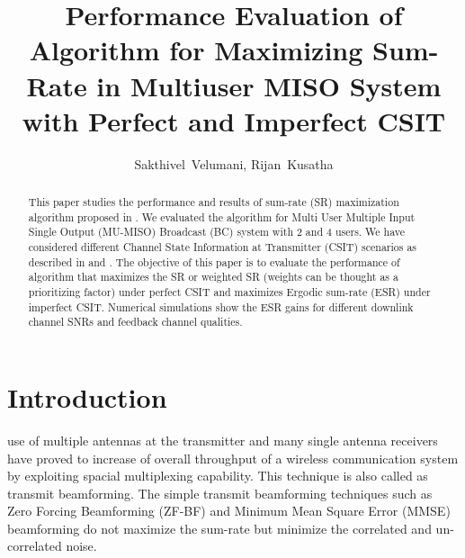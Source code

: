 \documentclass[journal]{IEEEtran}
\begin{document}
\title{Performance Evaluation of Algorithm for Maximizing Sum-Rate in Multiuser MISO System with Perfect and Imperfect CSIT}


\author{Sakthivel~Velumani, Rijan~Kusatha%
}


\maketitle


\begin{abstract}
This paper studies the performance and results of sum-rate (SR) maximization algorithm proposed in \cite{main}. We evaluated the algorithm for Multi User Multiple Input Single Output (MU-MISO) Broadcast (BC) system with 2 and 4 users. We have considered different Channel State Information at Transmitter (CSIT) scenarios as described in \cite{prelim} and \cite{main}. The objective of this paper is to evaluate the performance of algorithm that maximizes the SR or weighted SR (weights can be thought as a prioritizing factor) under perfect CSIT and maximizes Ergodic sum-rate (ESR) under imperfect CSIT. Numerical simulations show the ESR gains for different downlink channel SNRs and feedback channel qualities.
\end{abstract}

\IEEEpeerreviewmaketitle



\section{Introduction}

 use of multiple antennas at the transmitter and many single antenna receivers have proved to increase of overall throughput of a wireless communication system by exploiting spacial multiplexing capability. This technique is also called as transmit beamforming. The simple transmit beamforming techniques such as Zero Forcing Beamforming (ZF-BF) and Minimum Mean Square Error (MMSE) beamforming do not maximize the sum-rate but minimize the correlated and un-correlated noise. 
\end{document}
